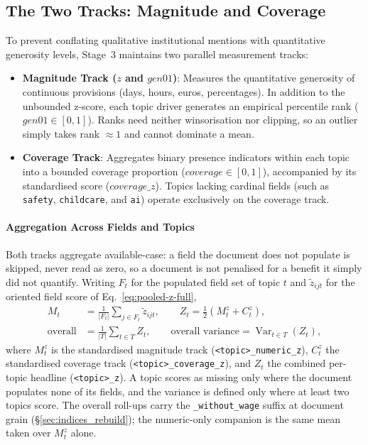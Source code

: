 \subsection{The Two Tracks: Magnitude and Coverage}
\label{sec:magnitude_coverage}

To prevent conflating qualitative institutional mentions with quantitative generosity levels, Stage~3 maintains two parallel measurement tracks:
\begin{itemize}[leftmargin=1.5em]
  \item \textbf{Magnitude Track ($z$ and $gen01$)}: Measures the quantitative generosity of continuous provisions (days, hours, euros, percentages). In addition to the unbounded z-score, each topic driver generates an empirical percentile rank ($gen01 \in [0, 1]$). Ranks need neither winsorisation nor clipping, so an outlier simply takes rank $\approx 1$ and cannot dominate a mean.
  \item \textbf{Coverage Track}: Aggregates binary presence indicators within each topic into a bounded coverage proportion ($coverage \in [0, 1]$), accompanied by its standardised score ($coverage\_z$). Topics lacking cardinal fields (such as \nolinkurl{safety}, \nolinkurl{childcare}, and \nolinkurl{ai}) operate exclusively on the coverage track.
\end{itemize}

\paragraph{Aggregation Across Fields and Topics}
Both tracks aggregate available-case: a field the document does not populate is skipped, never read as zero, so a document is not penalised for a benefit it simply did not quantify. Writing $F_t$ for the populated field set of topic $t$ and $\tilde{z}_{ijt}$ for the oriented field score of Eq.~\eqref{eq:pooled-z-full},
\begin{align}
\label{eq:aggregation}
M_t &= \frac{1}{|F_t|}\sum_{j \in F_t} \tilde{z}_{ijt},
\qquad
Z_t = \tfrac{1}{2}\left( M^{z}_{t} + C^{z}_{t} \right),
\nonumber \\[2pt]
\text{overall} &= \frac{1}{|T|}\sum_{t \in T} Z_t,
\qquad
\text{overall variance} = \operatorname{Var}_{t \in T}\left( Z_t \right),
\end{align}
where $M^{z}_{t}$ is the standardised magnitude track (\nolinkurl{<topic>_numeric_z}), $C^{z}_{t}$ the standardised coverage track (\nolinkurl{<topic>_coverage_z}), and $Z_t$ the combined per-topic headline (\nolinkurl{<topic>_z}). A topic scores as missing only where the document populates none of its fields, and the variance is defined only where at least two topics score. The overall roll-ups carry the \nolinkurl{_without_wage} suffix at document grain (\S\ref{sec:indices_rebuild}); the numeric-only companion is the same mean taken over $M^{z}_{t}$ alone.

